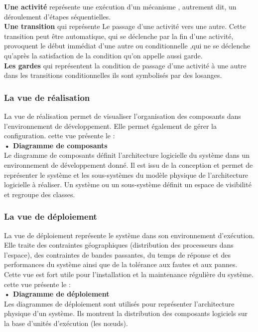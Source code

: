 \documentclass[11pt,a4paper,oneside]{book}
\begin{document}
			\textbf{Une activité} représente une exécution d’un mécanisme , autrement dit, un déroulement
			d’étapes séquentielles.\\
			
			\textbf{Une transition} qui représente Le passage d’une activité vers une autre. Cette transition peut être automatique, qui se déclenche par la fin d’une activité, provoquent le début immédiat d’une autre ou conditionnelle ,qui ne se déclenche qu’après la satisfaction de la condition qu’on appelle aussi garde.
			\\
			
			\textbf{Les gardes} qui représentent la condition de passage d’une activité à une autre dans les transitions conditionnelles ils sont symbolisés par des losanges.
			\subsubsection{La vue de réalisation }
			La vue de réalisation permet de visualiser l’organisation des composants dans l’environnement de développement. Elle permet également de gérer la configuration.
			cette vue présente le :
			\\
			
			\textbf{• Diagramme de composants}
			\\
			
			Le diagramme de composants définit l’architecture logicielle du système dans un environnement de développement donné. Il est issu de la conception et permet de représenter le système et les sous-systèmes du modèle physique de l’architecture logicielle à réaliser. Un système ou un sous-système définit un espace de visibilité et regroupe des classes.
			\subsubsection{La vue de déploiement}
			La vue de déploiement représente le système dans son environnement d’exécution. Elle traite des contraintes géographiques (distribution des processeurs dans l’espace), des contraintes de bandes passantes, du temps de réponse et des performances du système ainsi que de la tolérance aux fautes et aux pannes. Cette vue est fort utile pour l’installation et la maintenance régulière du système. cette vue présente le :
			\\
			
			\textbf{• Diagramme de déploiement}
			\\
			
			Les diagrammes de déploiement sont utilisés pour représenter l’architecture physique d’un système. Ils montrent la distribution des composants logiciels sur la base d’unités d’exécution (les nœuds).
\end{document}
